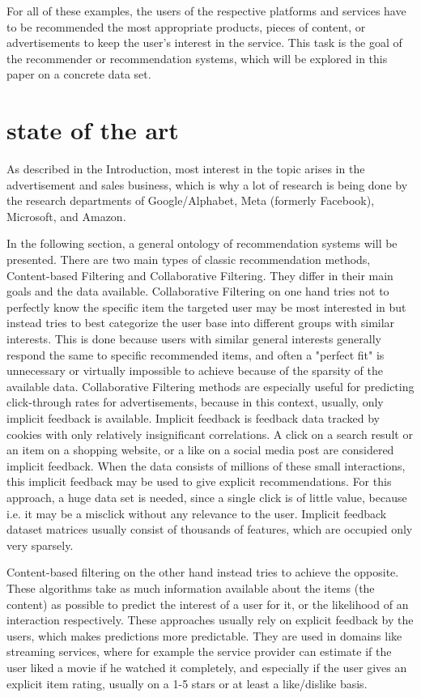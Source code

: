 \documentclass[10pt,final,journal,a4paper,oneside,twocolumn]{IEEEtran}
\begin{document}
For all of these examples, the users of the respective platforms and services have to be recommended the most appropriate products, pieces of content, or advertisements to keep the user's interest in the service. This task is the goal of the recommender or recommendation systems, which will be explored in this paper on a concrete data set.

\section{state of the art}\label{sec:stateoftheart}
As described in the Introduction, most interest in the topic arises in the advertisement and sales business, which is why a lot of research is being done by the research departments of Google/Alphabet, Meta (formerly Facebook), Microsoft, and Amazon.

In the following section, a general ontology of recommendation systems will be presented.
There are two main types of classic recommendation methods, Content-based Filtering and Collaborative Filtering. They differ in their main goals and the data available. 
Collaborative Filtering on one hand tries not to perfectly know the specific item the targeted user may be most interested in but instead tries to best categorize the user base into different groups with similar interests. This is done because users with similar general interests generally respond the same to specific recommended items, and often a "perfect fit" is unnecessary or virtually impossible to achieve because of the sparsity of the available data.
Collaborative Filtering methods are especially useful for predicting click-through rates for advertisements, because in this context, usually, only implicit feedback is available. Implicit feedback is feedback data tracked by cookies with only relatively insignificant correlations. A click on a search result or an item on a shopping website, or a like on a social media post are considered implicit feedback.  When the data consists of millions of these small interactions, this implicit feedback may be used to give explicit recommendations. For this approach, a huge data set is needed, since a single click is of little value, because i.e. it may be a misclick without any relevance to the user. Implicit feedback dataset matrices usually consist of thousands of features, which are occupied only very sparsely.



Content-based filtering on the other hand instead tries to achieve the opposite. These algorithms take as much information available about the items (the content) as possible to predict the interest of a user for it, or the likelihood of an interaction respectively. These approaches usually rely on explicit feedback by the users, which makes predictions more predictable. They are used in domains like streaming services, where for example the service provider can estimate if the user liked a movie if he watched it completely, and especially if the user gives an explicit item rating, usually on a 1-5 stars or at least a like/dislike basis.
\end{document}
